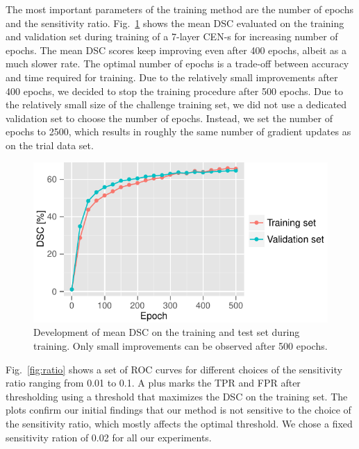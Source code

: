 The most important parameters of the training method are the number of epochs
and the sensitivity ratio. Fig.~\ref{fig:epochs} shows the mean DSC evaluated on
the training and validation set during training of a 7-layer CEN-s for
increasing number of epochs. The mean DSC scores keep improving even after 400
epochs, albeit as a much slower rate. The optimal number of epochs is a
trade-off between accuracy and time required for training. Due to the relatively
small improvements after 400 epochs, we decided to stop the training procedure
after 500 epochs. Due to the relatively small size of the challenge training
set, we did not use a dedicated validation set to choose the number of epochs.
Instead, we set the number of epochs to 2500, which results in roughly the same
number of gradient updates as on the trial data set.
\begin{figure}
\centering
\includegraphics[width=\columnwidth]{figures/ems_progress2}
\caption{Development of mean DSC on the training and test set during training.
Only small improvements can be observed after 500 epochs.}
\label{fig:epochs}
\end{figure}

Fig.~\ref{fig:ratio} shows a set of ROC curves for different choices of the
sensitivity ratio ranging from 0.01 to 0.1. A plus marks the TPR and FPR after
thresholding using a threshold that maximizes the DSC on the training set. The
plots confirm our initial findings that our method is not sensitive to the
choice of the sensitivity ratio, which mostly affects the optimal threshold. We
chose a fixed sensitivity ration of 0.02 for all our experiments.

